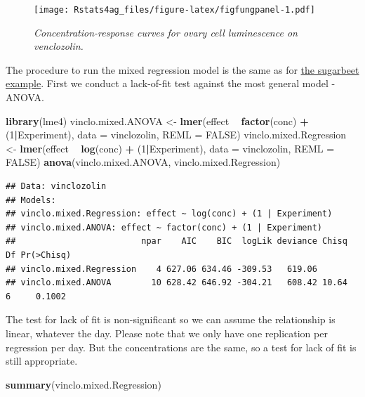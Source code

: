 \documentclass[letterpaper,]{book}
\newenvironment{Shaded}{\begin{snugshade}}{\end{snugshade}}
\newcommand{\DataTypeTok}[1]{\textcolor[rgb]{0.13,0.29,0.53}{#1}}
\newcommand{\DecValTok}[1]{\textcolor[rgb]{0.00,0.00,0.81}{#1}}
\newcommand{\KeywordTok}[1]{\textcolor[rgb]{0.13,0.29,0.53}{\textbf{#1}}}
\newcommand{\NormalTok}[1]{#1}
\newcommand{\OperatorTok}[1]{\textcolor[rgb]{0.81,0.36,0.00}{\textbf{#1}}}
\newcommand{\OtherTok}[1]{\textcolor[rgb]{0.56,0.35,0.01}{#1}}
\newcommand{\StringTok}[1]{\textcolor[rgb]{0.31,0.60,0.02}{#1}}
\begin{document}
\begin{figure}
\centering
\texttt{[image: Rstats4ag\_files/figure-latex/figfungpanel-1.pdf]}
\caption{\label{fig:figfungpanel}\emph{Concentration-response curves for ovary cell luminescence on venclozolin.}}
\end{figure}

The procedure to run the mixed regression model is the same as for \protect\hyperlink{mixedregressionex1}{the sugarbeet example}. First we conduct a lack-of-fit test against the most general model - ANOVA.

\begin{Shaded}
\begin{Highlighting}[]
\KeywordTok{library}\NormalTok{(lme4)}
\NormalTok{vinclo.mixed.ANOVA <-}\StringTok{ }\KeywordTok{lmer}\NormalTok{(effect }\OperatorTok{~}\StringTok{ }\KeywordTok{factor}\NormalTok{(conc) }\OperatorTok{+}\StringTok{ }\NormalTok{(}\DecValTok{1}\OperatorTok{|}\NormalTok{Experiment),}
                           \DataTypeTok{data =}\NormalTok{ vinclozolin, }\DataTypeTok{REML =} \OtherTok{FALSE}\NormalTok{)}
\NormalTok{vinclo.mixed.Regression <-}\StringTok{ }\KeywordTok{lmer}\NormalTok{(effect }\OperatorTok{~}\StringTok{ }\KeywordTok{log}\NormalTok{(conc) }\OperatorTok{+}\StringTok{ }\NormalTok{(}\DecValTok{1}\OperatorTok{|}\NormalTok{Experiment),}
                                \DataTypeTok{data =}\NormalTok{ vinclozolin, }\DataTypeTok{REML =} \OtherTok{FALSE}\NormalTok{)}
\KeywordTok{anova}\NormalTok{(vinclo.mixed.ANOVA, vinclo.mixed.Regression)}
\end{Highlighting}
\end{Shaded}

\begin{verbatim}
## Data: vinclozolin
## Models:
## vinclo.mixed.Regression: effect ~ log(conc) + (1 | Experiment)
## vinclo.mixed.ANOVA: effect ~ factor(conc) + (1 | Experiment)
##                         npar    AIC    BIC  logLik deviance Chisq Df Pr(>Chisq)
## vinclo.mixed.Regression    4 627.06 634.46 -309.53   619.06                    
## vinclo.mixed.ANOVA        10 628.42 646.92 -304.21   608.42 10.64  6     0.1002
\end{verbatim}

The test for lack of fit is non-significant so we can assume the relationship is linear, whatever the day. Please note that we only have one replication per regression per day. But the concentrations are the same, so a test for lack of fit is still appropriate.

\begin{Shaded}
\begin{Highlighting}[]
\KeywordTok{summary}\NormalTok{(vinclo.mixed.Regression)}
\end{Highlighting}
\end{Shaded}
\end{document}
